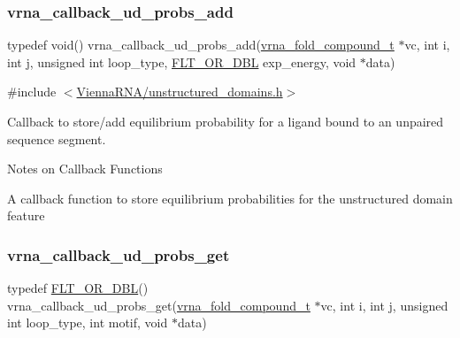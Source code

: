 \subsubsection{\texorpdfstring{vrna\+\_\+callback\+\_\+ud\+\_\+probs\+\_\+add}{vrna\_callback\_ud\_probs\_add}}
{\footnotesize\ttfamily typedef void() vrna\+\_\+callback\+\_\+ud\+\_\+probs\+\_\+add(\mbox{\hyperlink{group__fold__compound_ga1b0cef17fd40466cef5968eaeeff6166}{vrna\+\_\+fold\+\_\+compound\+\_\+t}} $\ast$vc, int i, int j, unsigned int loop\+\_\+type, \mbox{\hyperlink{group__data__structures_ga31125aeace516926bf7f251f759b6126}{F\+L\+T\+\_\+\+O\+R\+\_\+\+D\+BL}} exp\+\_\+energy, void $\ast$data)}



{\ttfamily \#include $<$\mbox{\hyperlink{unstructured__domains_8h}{Vienna\+R\+N\+A/unstructured\+\_\+domains.\+h}}$>$}



Callback to store/add equilibrium probability for a ligand bound to an unpaired sequence segment. 

\begin{DoxyRefDesc}{Notes on Callback Functions}
\item[\mbox{\hyperlink{callbacks__callbacks000014}{Notes on Callback Functions}}]A callback function to store equilibrium probabilities for the unstructured domain feature \end{DoxyRefDesc}
\mbox{\label{group__domains__up_gaa10ba1b6f1e179ea84c5caca9cdaae67}} 
\subsubsection{\texorpdfstring{vrna\+\_\+callback\+\_\+ud\+\_\+probs\+\_\+get}{vrna\_callback\_ud\_probs\_get}}
{\footnotesize\ttfamily typedef \mbox{\hyperlink{group__data__structures_ga31125aeace516926bf7f251f759b6126}{F\+L\+T\+\_\+\+O\+R\+\_\+\+D\+BL}}() vrna\+\_\+callback\+\_\+ud\+\_\+probs\+\_\+get(\mbox{\hyperlink{group__fold__compound_ga1b0cef17fd40466cef5968eaeeff6166}{vrna\+\_\+fold\+\_\+compound\+\_\+t}} $\ast$vc, int i, int j, unsigned int loop\+\_\+type, int motif, void $\ast$data)}



